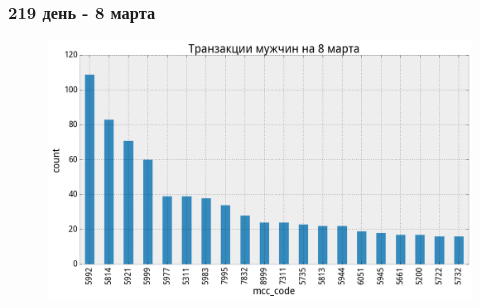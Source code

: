 \documentclass{beamer}
\begin{document}
\begin{frame}
\frametitle{219 день - 8 марта}

\begin{figure}
    \includegraphics[width=1\linewidth]{pics/men_8mar.png}
\end{figure}

\end{frame}

\end{document}
